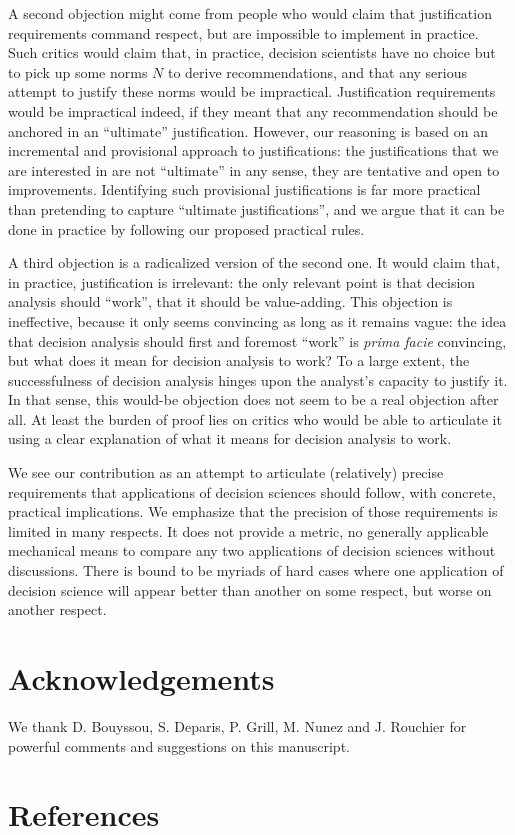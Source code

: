 \documentclass[preprint, french, english, 11pt, authoryear]{elsarticle}%
\begin{document}
A second objection might come from people who would claim that justification requirements command respect, but are impossible to implement in practice. Such critics would claim that, in practice, decision scientists have no choice but to pick up some norms $N$ to derive recommendations, and that any serious attempt to justify these norms would be impractical. Justification requirements would be impractical indeed, if they meant that any recommendation should be anchored in an “ultimate” justification. However, our reasoning is based on an incremental and provisional approach to justifications: the justifications that we are interested in are not ``ultimate'' in any sense, they are tentative and open to improvements. Identifying such provisional justifications is far more practical than pretending to capture ``ultimate justifications'', and we argue that it can be done in practice by following our proposed practical rules.

A third objection is a radicalized version of the second one. It would claim that, in practice, justification is irrelevant: the only relevant point is that decision analysis should ``work'', that it should be value-adding. This objection is ineffective, because it only seems convincing as long as it remains vague: the idea that decision analysis should first and foremost ``work'' is \emph{prima facie} convincing, but what does it mean for decision analysis to work? 
To a large extent, the successfulness of decision analysis hinges upon the analyst's capacity to justify it. In that sense, this would-be objection does not seem to be a real objection after all. At least the burden of proof lies on critics who would be able to articulate it using a clear explanation of what it means for decision analysis to work. 

We see our contribution as an attempt to articulate (relatively) precise requirements that applications of decision sciences should follow, with concrete, practical implications. We emphasize that the precision of those requirements is limited in many respects.
It does not provide a metric, no generally applicable mechanical means to compare any two applications of decision sciences without discussions. There is bound to be myriads of hard cases where one application of decision science will appear better than another on some respect, but worse on another respect.

\setcounter{secnumdepth}{0}
\section{Acknowledgements}
We thank D. Bouyssou, S. Deparis, P. Grill, M. Nunez and J. Rouchier for powerful comments and suggestions on this manuscript.

\section{References}

\end{document}
